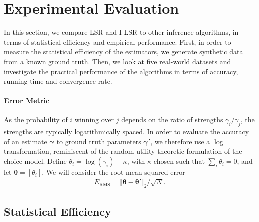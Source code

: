 \section{Experimental Evaluation}
\label{fi:sec:experiments}

In this section, we compare LSR and I-LSR to other inference algorithms, in terms of statistical efficiency and empirical performance.
First, in order to measure the statistical efficiency of the estimators, we generate synthetic data from a known ground truth.
Then, we look at five real-world datasets and investigate the practical performance of the algorithms in terms of accuracy, running time and convergence rate.

\paragraph{Error Metric}
As the probability of $i$ winning over $j$ depends on the ratio of strengths $\gamma_i / \gamma_j$, the strengths are typically logarithmically spaced.
In order to evaluate the accuracy of an estimate $\bm{\gamma}$ to ground truth parameters $\bm{\gamma}'$, we therefore use a $\log$ transformation, reminiscent of the random-utility-theoretic formulation of the choice model.
Define $\theta_i \doteq \log (\gamma_i) - \kappa$, with $\kappa$ chosen such that $\sum_i \theta_i = 0$, and let $\bm{\theta} = [\theta_i]$.
We will consider the root-mean-squared error
\begin{align*}
E_{\text{RMS}} = \Vert \bm{\theta} - \bm{\theta}' \Vert_2 / \sqrt{N}.
\end{align*}

\subsection{Statistical Efficiency}

